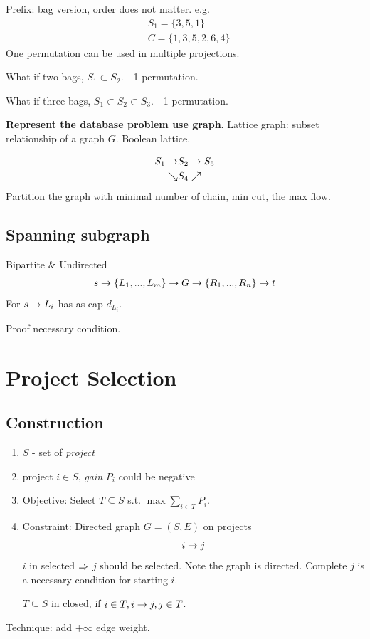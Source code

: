 \documentclass[a4paper]{report}
\theoremstyle{definition}
\begin{document}
Prefix: bag version, order does not matter. e.g.
\begin{align*}
& S_1 = \{3, 5, 1\} \\
& C= \{1, 3,5, 2, 6, 4\}
\end{align*}
One permutation can be used in multiple projections. 

What if two bags, $S_1 \subset S_2$. - 1 permutation.

What if three bags, $S_1 \subset S_2 \subset S_3$. - 1 permutation.

\textbf{Represent the database problem use graph}. Lattice graph: subset relationship of a graph $G$. Boolean lattice.

\begin{align*}
S_1 \rightarrow & S_2 \rightarrow S_5\\
\searrow & S_4 \nearrow
\end{align*}
Partition the graph with minimal number of chain, min cut, the max flow. 
\subsection{Spanning subgraph}
Bipartite \& Undirected
\begin{align*}
s \rightarrow \{L_1, ..., L_m\} \rightarrow G \rightarrow \{R_1, ..., R_n\} \rightarrow t
\end{align*}
For $s \rightarrow L_i$ has as cap $d_{L_i}$. 

Proof necessary condition. 

\section{Project Selection}
\subsection{Construction}
\begin{enumerate}
\item $S$ - set of \textit{project}
\item project $i\in S$, \textit{gain} $P_i$ could be negative 
\item Objective: Select $T\subseteq S$ s.t. $\max \sum_{i\in T} P_i$.
\item Constraint: Directed graph $G=(S, E)$ on projects 
$$
i \rightarrow j
$$
$i$ in selected $\Rightarrow$ $j$ should be selected. Note the graph is directed. Complete $j$ is a necessary condition for starting $i$. 

$T\subseteq S$ in closed, if $i\in T, i\rightarrow j, j \in T$. 
\end{enumerate}
Technique: add $+\infty$ edge weight. 
\end{document}
